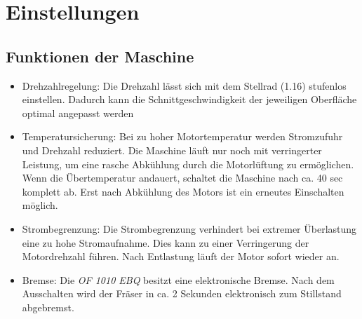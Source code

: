 \documentclass{\basedir/fablab-document}
\begin{document}
\section{Einstellungen}
\subsection{Funktionen der Maschine}
\begin{itemize}
\item Drehzahlregelung: Die Drehzahl lässt sich mit dem Stellrad (1.16) stufenlos einstellen. Dadurch kann die Schnittgeschwindigkeit der jeweiligen Oberfläche optimal angepasst werden
\item Temperatursicherung: Bei zu hoher Motortemperatur werden Stromzufuhr und Drehzahl reduziert. Die Maschine läuft nur noch mit verringerter Leistung, um eine rasche Abkühlung durch die Motorlüftung zu ermöglichen. Wenn die Übertemperatur andauert, schaltet die Maschine nach ca. 40 sec komplett ab. Erst nach Abkühlung des Motors ist ein erneutes Einschalten möglich.
\item Strombegrenzung: Die Strombegrenzung verhindert bei extremer Überlastung eine zu hohe Stromaufnahme. Dies kann zu einer Verringerung der Motordrehzahl führen. Nach Entlastung läuft der Motor sofort wieder an.
\item Bremse: Die \textit{OF 1010 EBQ} besitzt eine elektronische Bremse. Nach dem Ausschalten wird der Fräser in ca. 2 Sekunden elektronisch zum Stillstand abgebremst.
\end{itemize}
\end{document}
